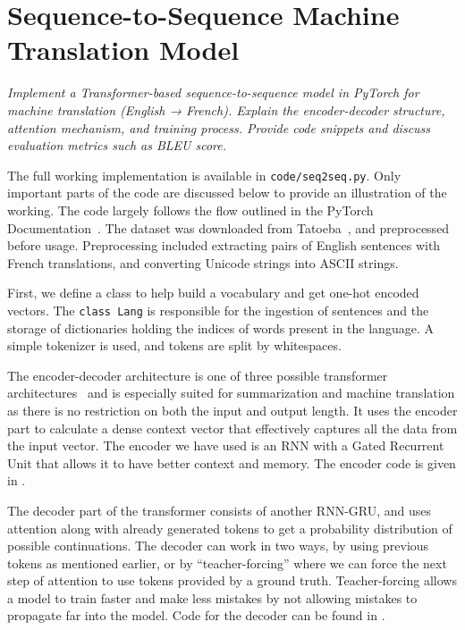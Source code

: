 \section[Sequence-to-Sequence Model]{Sequence-to-Sequence Machine Translation Model}\label{sec:Sequence-to-Sequence Model} %
\textit{Implement a Transformer-based sequence-to-sequence model in PyTorch for 
machine translation (English → French). Explain the encoder-decoder structure,
attention mechanism, and training process. Provide code snippets and discuss 
evaluation metrics such as BLEU score.}

The full working implementation is available in \texttt{code/seq2seq.py}. 
Only important parts of the code are discussed below to
provide an illustration of the working.
The code largely follows the flow outlined in the PyTorch 
Documentation~\cite{robertsonNLPScratchTranslation}.
The dataset was downloaded from Tatoeba~\cite{TatoebaCollectionSentencesa},
and preprocessed before usage. 
Preprocessing included extracting pairs of English sentences with French
translations, and converting Unicode strings into ASCII strings. 

First, we define a class to help build a vocabulary and 
get one-hot encoded vectors.
The \texttt{class Lang} is responsible for
the ingestion of sentences and the storage of dictionaries
holding the indices of words present in the language.
A simple tokenizer is used, and tokens are split by whitespaces.

The encoder-decoder architecture is one of three possible
transformer architectures~\cite{aitkenUnderstandingHowEncoderDecoder2021}
and is especially suited for summarization and machine translation
as there is no restriction on both the input and output length.
It uses the encoder part to calculate a dense context vector that
effectively captures all the data from the input vector. 
The encoder we have used is an RNN with a Gated Recurrent Unit
that allows it to have better context and memory.
The encoder code is given in 
.


The decoder part of the transformer consists of another RNN-GRU,
and uses attention along with already generated tokens to
get a probability distribution of possible continuations.
The decoder can work in two ways, by using previous tokens as mentioned earlier,
or by ``teacher-forcing'' where we can force the next step of attention to use
tokens provided by a ground truth. 
Teacher-forcing allows a model to train faster and make less mistakes by not
allowing mistakes to propagate far into the model.
Code for the decoder can be found in .


